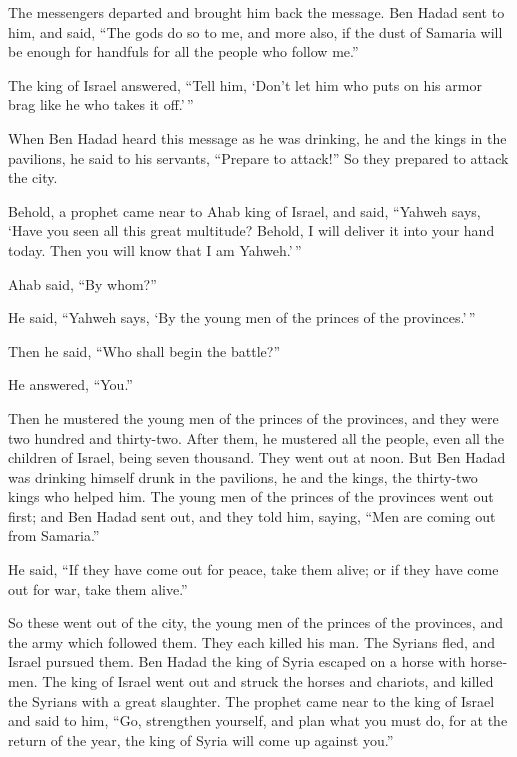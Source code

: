 \begin{paracol}{2}
\begin{otherlanguage}{english}
The messengers departed and brought him back the message.
 Ben Hadad sent to him, and said, ``The gods do so to me,
and more also, if the dust of Samaria will be enough for handfuls for
all the people who follow me.''

 The king of Israel answered, ``Tell him, `Don't let him
who puts on his armor brag like he who takes it off.'\,''

 When Ben Hadad heard this message as he was drinking, he
and the kings in the pavilions, he said to his servants, ``Prepare to
attack!'' So they prepared to attack the city.

 Behold, a prophet came near to Ahab king of Israel, and
said, ``Yahweh says, `Have you seen all this great multitude? Behold, I
will deliver it into your hand today. Then you will know that I am
Yahweh.'\,''

 Ahab said, ``By whom?''

He said, ``Yahweh says, `By the young men of the princes of the
provinces.'\,''

Then he said, ``Who shall begin the battle?''

He answered, ``You.''

 Then he mustered the young men of the princes of the
provinces, and they were two hundred and thirty-two. After them, he
mustered all the people, even all the children of Israel, being seven
thousand.  They went out at noon. But Ben Hadad was
drinking himself drunk in the pavilions, he and the kings, the
thirty-two kings who helped him.  The young men of the
princes of the provinces went out first; and Ben Hadad sent out, and
they told him, saying, ``Men are coming out from Samaria.''

 He said, ``If they have come out for peace, take them
alive; or if they have come out for war, take them alive.''

 So these went out of the city, the young men of the
princes of the provinces, and the army which followed them.
 They each killed his man. The Syrians fled, and Israel
pursued them. Ben Hadad the king of Syria escaped on a horse with
horsemen.  The king of Israel went out and struck the
horses and chariots, and killed the Syrians with a great slaughter.
 The prophet came near to the king of Israel and said to
him, ``Go, strengthen yourself, and plan what you must do, for at the
return of the year, the king of Syria will come up against you.''


\end{otherlanguage}
\end{paracol}
